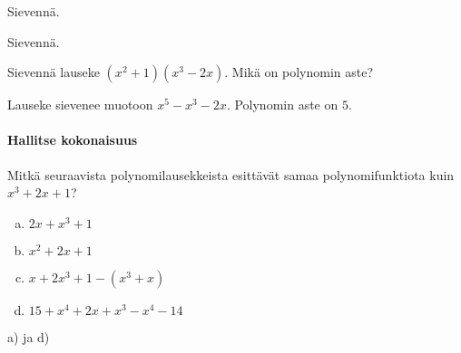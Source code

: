 \begin{tehtavasivu}
\begin{tehtava}
    Sievennä.
    \begin{alakohdat}
    \end{alakohdat}
    \begin{vastaus}
        \begin{alakohdat}
        \end{alakohdat}
    \end{vastaus}
\end{tehtava}

\begin{tehtava}
    Sievennä.
    \begin{alakohdat}
\end{alakohdat}
    \begin{vastaus}
        \begin{alakohdat}
        \end{alakohdat}
    \end{vastaus}
\end{tehtava}

\begin{tehtava}
    Sievennä lauseke $(x^2+1)(x^3-2x)$. Mikä on polynomin aste?
    \begin{vastaus}
        Lauseke sievenee muotoon $x^5-x^3-2x$. Polynomin aste on $5$.
    \end{vastaus}
\end{tehtava}

\paragraph*{Hallitse kokonaisuus}

\begin{tehtava}
	Mitkä seuraavista polynomilausekkeista esittävät samaa polynomifunktiota kuin
	$x^3+2x+1$?
	\begin{enumerate}[a)]
		\item $2x+x^3+1$
		\item $x^2+2x+1$
		\item $x+2x^3+1 - (x^3+x)$
		\item $15+x^4+2x+x^3-x^4-14$
	\end{enumerate}
	\begin{vastaus}
		a) ja d)
	\end{vastaus}
\end{tehtava}


\end{tehtavasivu}
